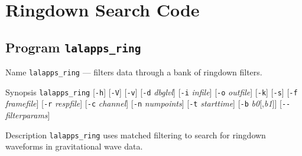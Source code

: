 \chapter{Ringdown Search Code}
\label{chapter:ringdown}

\section{Program \texttt{lalapps\_ring}}
\label{program:lalapps-ring}

\begin{entry}

\item[Name]
\verb$lalapps_ring$ --- filters data through a bank of ringdown filters.

\item[Synopsis]
\verb$lalapps_ring$ [\verb$-h$] [\verb$-V$] [\verb$-v$]
  [\verb$-d$ \textit{dbglvl}] [\verb$-i$ \textit{infile}]
  [\verb$-o$ \textit{outfile}] [\verb$-k$] [\verb$-s$]
  [\verb$-f$ \textit{framefile}] [\verb$-r$ \textit{respfile}]
  [\verb$-c$ \textit{channel}] [\verb$-n$ \textit{numpoints}]
  [\verb$-t$ \textit{starttime}] [\verb$-b$ \textit{b0}[,\textit{b1}]]
  [\verb$--$ \textit{filterparams}]

\item[Description]
\verb$lalapps_ring$ uses matched filtering to search for ringdown waveforms in
gravitational wave data.


\end{entry}
